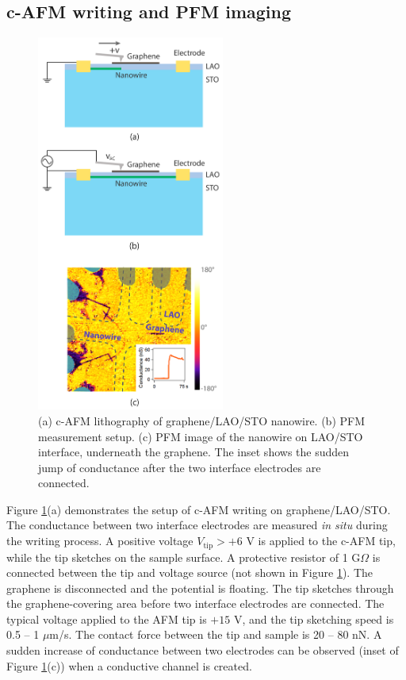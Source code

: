 \documentclass[pdflatex, sectionletters, 12pt]{pittetd}    %
\begin{document}
\subsection{c-AFM writing and PFM imaging}
\begin{figure}[p]
	\centering
	\includegraphics[width=0.55\textwidth]{Drawing/GraphenePFM.pdf}
	\caption{(a) c-AFM lithography of graphene/LAO/STO nanowire. (b) PFM measurement setup. (c) PFM image of the nanowire on LAO/STO interface, underneath the graphene. The inset shows the sudden jump of conductance after the two interface electrodes are connected.}
	\label{FIG:GraphenePFM}
\end{figure}

Figure \ref{FIG:GraphenePFM}(a) demonstrates the setup of c-AFM writing on graphene/LAO/STO. The conductance between two interface electrodes are measured \textit{in situ} during the writing process. A positive voltage $V_\mathrm{tip} > +6$ V is applied to the c-AFM tip, while the tip sketches on the sample surface. A protective resistor of 1 G$\Omega$ is connected between the tip and voltage source (not shown in Figure \ref{FIG:GraphenePFM}). The graphene is disconnected and the potential is floating. The tip sketches through the graphene-covering area before two interface electrodes are connected. The typical voltage applied to the AFM tip is $+15$ V, and the tip sketching speed is 0.5 -- 1 $\mu$m/s. The contact force between the tip and sample is 20 -- 80 nN. A sudden increase of conductance between two electrodes can be observed (inset of Figure \ref{FIG:GraphenePFM}(c)) when a conductive channel is created. 
\end{document}

